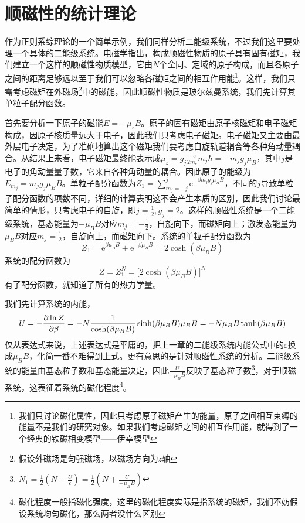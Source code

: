 \documentclass[../../main.tex]{subfiles}
\begin{document}
\section{顺磁性的统计理论}

作为正则系综理论的一个简单示例，我们同样分析二能级系统，不过我们这里要处理一个具体的二能级系统。电磁学指出，构成顺磁性物质的原子具有固有磁矩，我们建立一个这样的顺磁性物质模型，它由\(N\)个全同、定域的原子构成，而且各原子之间的距离足够远以至于我们可以忽略各磁矩之间的相互作用能\footnote{我们只讨论磁化属性，因此只考虑原子磁矩产生的能量，原子之间相互束缚的能量不是我们的研究对象。如果我们考虑磁矩之间的相互作用能，就得到了一个经典的铁磁相变模型——伊幸模型}。这样，我们只需考虑磁矩在外磁场\footnote{假设外磁场是匀强磁场，以磁场方向为\(z\)轴}中的磁能，因此顺磁性物质是玻尔兹曼系统，我们先计算其单粒子配分函数。

首先要分析一下原子的磁能\(E=-\mu_zB\)。原子的固有磁矩由原子核磁矩和电子磁矩构成，因原子核质量远大于电子，因此我们只考虑电子磁矩。电子磁矩又主要由最外层电子决定，为了准确地算出这个磁矩我们要考虑自旋轨道耦合等各种角动量耦合。从结果上来看，电子磁矩最终能表示成\(\mu_z=g_j\frac{-e}{2m_e}m_j\hbar=-m_jg_j\mu_B\)，其中\(j\)是电子的角动量量子数，它来自各种角动量的耦合。因此原子的能级为\(E_{m_j}=m_jg_j\mu_BB\)。单粒子配分函数为\(\displaystyle Z_1=\sum_{m_j=-j}^{j}\mathrm{e}^{-\beta m_jg_j\mu_BB}\)，不同的\(j\)导致单粒子配分函数的项数不同，详细的计算表明这不会产生本质的区别，因此我们讨论最简单的情形，只考虑电子的自旋，即\(j=\frac{1}{2},g_j=2\)。这样的顺磁性系统是一个二能级系统，基态能量为\(-\mu_BB\)对应\(m_j=-\frac{1}{2}\)，自旋向下，而磁矩向上；激发态能量为\(\mu_BB\)对应\(m_j=\frac{1}{2}\)，自旋向上，而磁矩向下。系统的单粒子配分函数为
\begin{equation}
    Z_1=\mathrm{e}^{\beta \mu_B B}+\mathrm{e}^{-\beta \mu_B B}=2\cosh(\beta \mu_B B)
\end{equation}
系统的配分函数为
\begin{equation}
    Z=Z_1^N=\big[2\cosh(\beta \mu_B B)\big]^N
\end{equation}
有了配分函数，就知道了所有的热力学量。

我们先计算系统的内能，
\begin{equation}
    U=-\pdv{\ln Z}{\beta}=-N\frac{1}{\cosh(\beta \mu_BB)}\sinh(\beta \mu_BB)\mu_BB=-N\mu_BB\tanh(\beta \mu_BB)
\end{equation}
仅从表达式来说，上述表达式是平庸的，把上一章的二能级系统内能公式中的\(\varepsilon\)换成\(\mu_BB\)，化简一番不难得到上式。更有意思的是针对顺磁性系统的分析。二能级系统的能量由基态粒子数和基态能量决定，因此\(\frac{U}{-\mu_BB}\)反映了基态粒子数\footnote{\(N_1=\frac{1}{2}\left(N-\frac{U}{\varepsilon}\right)=\frac{1}{2}\left(N+\frac{U}{-\mu_BB}\right)\)}，对于顺磁系统，这表征着系统的磁化程度\footnote{磁化程度一般指磁化强度，这里的磁化程度实际是指系统的磁矩，我们不妨假设系统均匀磁化，那么两者没什么区别}。
\end{document}
